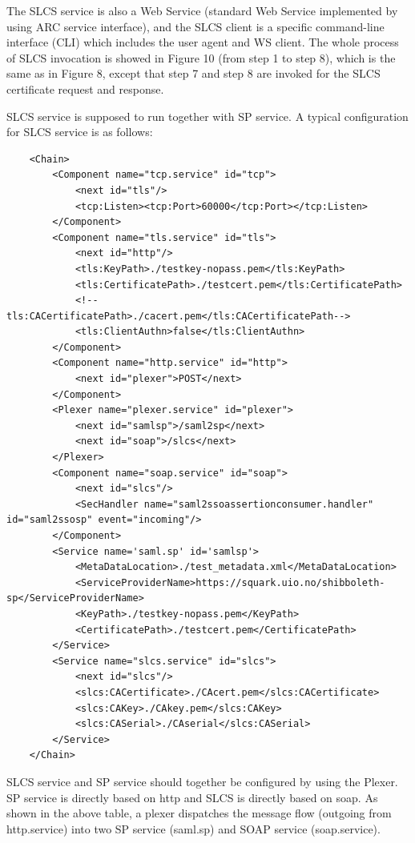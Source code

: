 \documentclass{article}                            %
\begin{document}
    The SLCS service is also a Web Service (standard Web Service implemented by using ARC service interface), and the SLCS client is a specific command-line interface (CLI) which includes the user agent and WS client. The whole process of SLCS invocation is showed in Figure 10 (from step 1 to step 8), which is the same as in Figure 8, except that step 7 and step 8 are invoked for the SLCS certificate request and response.


 SLCS service is supposed to run together with SP service. A typical configuration for SLCS service is as follows:

\begin{verbatim}
    <Chain>
        <Component name="tcp.service" id="tcp"> 
            <next id="tls"/> 
            <tcp:Listen><tcp:Port>60000</tcp:Port></tcp:Listen> 
        </Component> 
        <Component name="tls.service" id="tls"> 
            <next id="http"/> 
            <tls:KeyPath>./testkey-nopass.pem</tls:KeyPath> 
            <tls:CertificatePath>./testcert.pem</tls:CertificatePath> 
            <!--tls:CACertificatePath>./cacert.pem</tls:CACertificatePath--> 
            <tls:ClientAuthn>false</tls:ClientAuthn> 
        </Component> 
        <Component name="http.service" id="http"> 
            <next id="plexer">POST</next> 
        </Component> 
        <Plexer name="plexer.service" id="plexer"> 
            <next id="samlsp">/saml2sp</next> 
            <next id="soap">/slcs</next> 
        </Plexer> 
        <Component name="soap.service" id="soap"> 
            <next id="slcs"/> 
            <SecHandler name="saml2ssoassertionconsumer.handler" id="saml2ssosp" event="incoming"/> 
        </Component> 
        <Service name='saml.sp' id='samlsp'> 
            <MetaDataLocation>./test_metadata.xml</MetaDataLocation> 
            <ServiceProviderName>https://squark.uio.no/shibboleth-sp</ServiceProviderName> 
            <KeyPath>./testkey-nopass.pem</KeyPath> 
            <CertificatePath>./testcert.pem</CertificatePath> 
        </Service> 
        <Service name="slcs.service" id="slcs"> 
            <next id="slcs"/> 
            <slcs:CACertificate>./CAcert.pem</slcs:CACertificate> 
            <slcs:CAKey>./CAkey.pem</slcs:CAKey> 
            <slcs:CASerial>./CAserial</slcs:CASerial> 
        </Service> 
    </Chain> 
\end{verbatim}

    SLCS service and SP service should together be configured by using the Plexer. SP service is directly based on http and SLCS is directly based on soap. As shown in the above table, a plexer dispatches the message flow (outgoing from http.service) into two SP service (saml.sp) and SOAP service (soap.service). 
\end{document}
